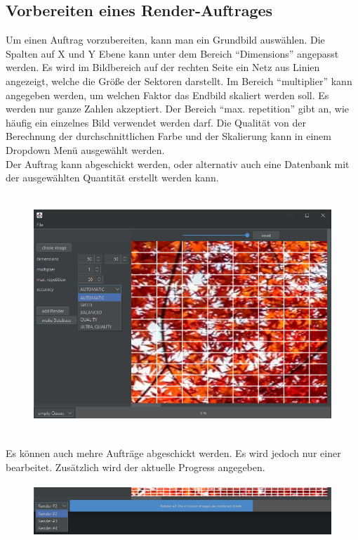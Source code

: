 \newpage
\subsection*{Vorbereiten eines Render-Auftrages}
Um einen Auftrag vorzubereiten, kann man ein Grundbild auswählen. Die Spalten auf X und Y Ebene kann unter dem Bereich ``Dimensions'' angepasst werden. Es wird im Bildbereich auf der rechten Seite ein Netz aus Linien angezeigt, welche die Größe der Sektoren darstellt. Im Bereich ``multiplier'' kann angegeben werden, um welchen Faktor das Endbild skaliert werden soll. Es werden nur ganze Zahlen akzeptiert. Der Bereich ``max. repetition'' gibt an, wie häufig ein einzelnes Bild verwendet werden darf. Die Qualität von der Berechnung der durchschnittlichen Farbe und der Skalierung kann in einem Dropdown Menü ausgewählt werden.\\ Der Auftrag kann abgeschickt werden, oder alternativ auch eine Datenbank mit der ausgewählten Quantität erstellt werden kann.
\begin{figure}[h]
    \centering
    \includegraphics[height=9cm]{images/Bedienungsanleitung/normal UI.png}
    \label{Hauptbereich}
\end{figure}
Es können auch mehre Aufträge abgeschickt werden. Es wird jedoch nur einer bearbeitet. Zusätzlich wird der aktuelle Progress angegeben.
\begin{figure}[h]
    \centering
    \includegraphics[height=2cm]{images/Bedienungsanleitung/render queue.png}
\end{figure}

